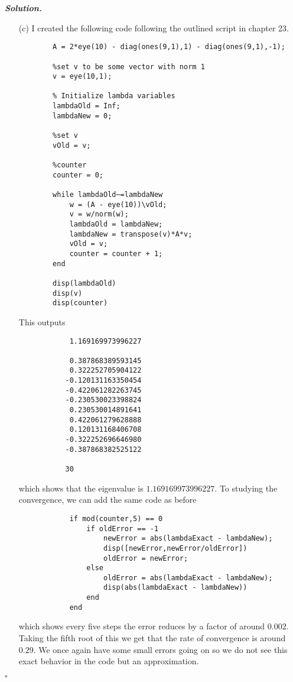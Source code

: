\documentclass[12pt]{report}
\newenvironment{solution}[1][\it{Solution}]{\textbf{#1. } }{$\square$}
\begin{document}
\begin{solution}
\begin{enumerate}
        \item [(c)]
        I created the following code following the outlined script in chapter 23. 
        \begin{verbatim}
        A = 2*eye(10) - diag(ones(9,1),1) - diag(ones(9,1),-1);

        %set v to be some vector with norm 1
        v = eye(10,1);

        % Initialize lambda variables
        lambdaOld = Inf;
        lambdaNew = 0;

        %set v
        vOld = v;

        %counter
        counter = 0;

        while lambdaOld~=lambdaNew
            w = (A - eye(10))\vOld;
            v = w/norm(w);
            lambdaOld = lambdaNew;
            lambdaNew = transpose(v)*A*v;
            vOld = v;
            counter = counter + 1;
        end

        disp(lambdaOld)
        disp(v)
        disp(counter)
        \end{verbatim}
        This outputs
        \begin{verbatim}
            1.169169973996227

            0.387868389593145
            0.322252705904122
           -0.120131163350454
           -0.422061282263745
           -0.230530023398824
            0.230530014891641
            0.422061279628888
            0.120131168406708
           -0.322252696646980
           -0.387868382525122

           30
        \end{verbatim}
        which shows that the eigenvalue is $1.169169973996227$. To studying the convergence, we can add the same code as before
        \begin{verbatim}
            if mod(counter,5) == 0
                if oldError == -1
                    newError = abs(lambdaExact - lambdaNew);
                    disp([newError,newError/oldError])
                    oldError = newError;
                else
                    oldError = abs(lambdaExact - lambdaNew);
                    disp(abs(lambdaExact - lambdaNew))
                end
            end
        \end{verbatim}
        which shows every five steps the error reduces by a factor of around $0.002$. Taking the fifth root of this we get that the rate of convergence is around $0.29$. We once again have some small errors going on so we do not see this exact behavior in the code but an approximation.
    \end{enumerate}
\end{solution}

\newpage
\end{document}
